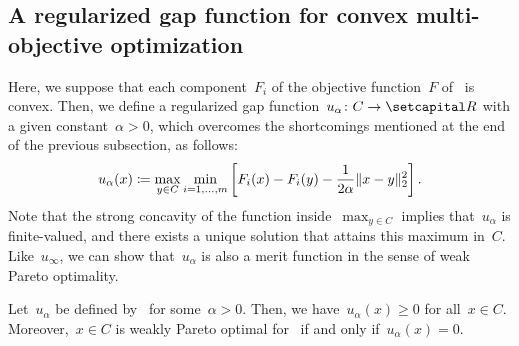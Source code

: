 \documentclass[../../main]{subfiles}
\begin{document}
\subsection{A regularized gap function for convex multi-objective optimization} 
Here, we suppose that each component~$F_i$ of the objective function~$F$ of~ is convex.
Then, we define a regularized gap function~$u_\alpha \colon C \to \setR$ with a given constant~$\alpha > 0$, which overcomes the shortcomings mentioned at the end of the previous subsection, as follows:
\begin{equation} \label{eq:reg_gap_MO}
    u_\alpha(x) \coloneqq \max_{y \in C} \min_{i = 1, \dots, m} \left[ F_i(x) - F_i(y) - \frac{1}{2 \alpha}\lVert x - y\rVert_2^2 \right]
    .\end{equation}
Note that the strong concavity of the function inside~$\max_{y \in C}$ implies that~$u_\alpha$ is finite-valued, and there exists a unique solution that attains this maximum in~$C$.
Like~$u_\infty$, we can show that~$u_\alpha$ is also a merit function in the sense of weak Pareto optimality.
\begin{theorem} 
    Let~$u_\alpha$ be defined by~ for some~$\alpha > 0$.
    Then, we have~$u_\alpha(x) \ge 0$ for all~$x \in C$.
    Moreover,~$x \in C$ is weakly Pareto optimal for~ if and only if~$u_\alpha(x) = 0$.
\end{theorem}
\end{document}
